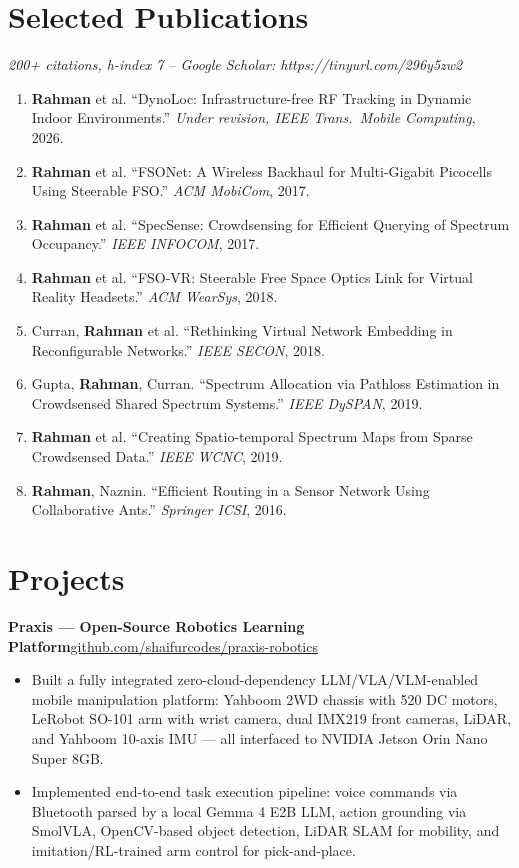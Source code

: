\documentclass[10.5pt,letterpaper]{article}
\newcommand{\entrytitle}[2]{%
  \textbf{#1}\hfill #2%
}
\begin{document}
\section{Selected Publications}
\textit{200+ citations, h-index 7 -- Google Scholar: https://tinyurl.com/296y5zw2}
%
\begin{enumerate}[leftmargin=1.6em, itemsep=1pt, topsep=2pt, parsep=0pt]
  \item \textbf{Rahman} et al. ``DynoLoc: Infrastructure-free RF Tracking in Dynamic Indoor Environments.'' \textit{Under revision, IEEE Trans.\ Mobile Computing}, 2026.
  \item \textbf{Rahman} et al. ``FSONet: A Wireless Backhaul for Multi-Gigabit Picocells Using Steerable FSO.'' \textit{ACM MobiCom}, 2017.
  \item \textbf{Rahman} et al. ``SpecSense: Crowdsensing for Efficient Querying of Spectrum Occupancy.'' \textit{IEEE INFOCOM}, 2017.
  \item \textbf{Rahman} et al. ``FSO-VR: Steerable Free Space Optics Link for Virtual Reality Headsets.'' \textit{ACM WearSys}, 2018.
  \item Curran, \textbf{Rahman} et al. ``Rethinking Virtual Network Embedding in Reconfigurable Networks.'' \textit{IEEE SECON}, 2018.
  \item Gupta, \textbf{Rahman}, Curran. ``Spectrum Allocation via Pathloss Estimation in Crowdsensed Shared Spectrum Systems.'' \textit{IEEE DySPAN}, 2019.
  \item \textbf{Rahman} et al. ``Creating Spatio-temporal Spectrum Maps from Sparse Crowdsensed Data.'' \textit{IEEE WCNC}, 2019.
  \item \textbf{Rahman}, Naznin. ``Efficient Routing in a Sensor Network Using Collaborative Ants.'' \textit{Springer ICSI}, 2016.
\end{enumerate}
%
\section{Projects}

\entrytitle{Praxis --- Open-Source Robotics Learning Platform}{\href{https://github.com/shaifurcodes/praxis-robotics}{github.com/shaifurcodes/praxis-robotics}}
\begin{itemize}
    \item Built a fully integrated zero-cloud-dependency LLM/VLA/VLM-enabled mobile manipulation platform: Yahboom 2WD chassis with 520 DC motors, LeRobot SO-101 arm with wrist camera, dual IMX219 front cameras, LiDAR, and Yahboom 10-axis IMU --- all interfaced to NVIDIA Jetson Orin Nano Super 8GB.
    \item Implemented end-to-end task execution pipeline: voice commands via Bluetooth parsed by a local Gemma 4 E2B LLM, action grounding via SmolVLA, OpenCV-based object detection, LiDAR SLAM for mobility, and imitation/RL-trained arm control for pick-and-place.
\end{itemize}
\end{document}
